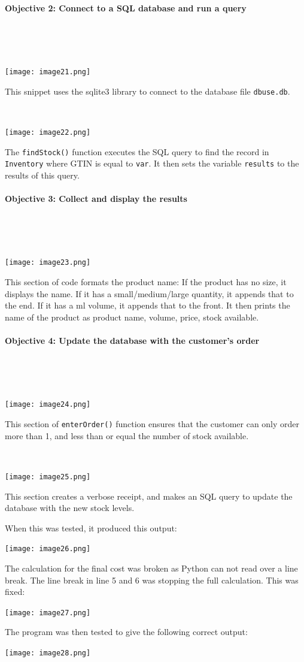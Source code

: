 \documentclass[a4paper]{article}
\begin{document}
\paragraph{Objective 2: Connect to a SQL database and run a query} ~\par ~\par
\noindent\texttt{[image: image21.png]} ~\par
This snippet uses the sqlite3 library to connect to the database file \verb?dbuse.db?. ~\par ~\par
\noindent\texttt{[image: image22.png]} ~\par
The \verb|findStock()| function executes the SQL query to find the record in \verb?Inventory? where GTIN is equal to \verb?var?. It then sets the variable \verb?results? to the results of this query. ~\par
\paragraph{Objective 3: Collect and display the results} ~\par ~\par
\noindent\texttt{[image: image23.png]} \par
This section of code formats the product name: If the product has no size, it displays the name. If it has a small/medium/large quantity, it appends that to the end. If it has a ml volume, it appends that to the front. It then prints the name of the product as product name, volume, price, stock available.
\newpage
\paragraph{Objective 4: Update the database with the customer's order} ~\par ~\par
\noindent\texttt{[image: image24.png]} \par 
This section of \verb|enterOrder()| function ensures that the customer can only order more than 1, and less than or equal the number of stock available. ~\par ~\par
\noindent\texttt{[image: image25.png]} \par
This section creates a verbose receipt, and makes an SQL query to update the database with the new stock levels. \par
When this was tested, it produced this output: \par
\noindent\texttt{[image: image26.png]} \par 
The calculation for the final cost was broken as Python can not read over a line break. The line break in line 5 and 6 was stopping the full calculation. This was fixed: \par
\noindent\texttt{[image: image27.png]} \par 
The program was then tested to give the following correct output: \par
\noindent\texttt{[image: image28.png]} \par 
\newpage
\end{document}
